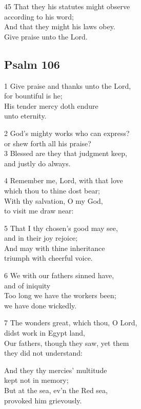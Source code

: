 45 That they his statutes might observe\\
according to his word;\\
And that they might his laws obey.\\
Give praise unto the Lord.

\begin{center}
\quad{}\quad{}
\end{center}

\subsection*{Psalm 106}

1 Give praise and thanks unto the Lord,\\
for bountiful is he;\\
His tender mercy doth endure\\
unto eternity.

2 God’s mighty works who can express?\\
or shew forth all his praise?\\
3 Blessed are they that judgment keep,\\
and justly do always.

4 Remember me, Lord, with that love\\
which thou to thine dost bear;\\
With thy salvation, O my God,\\
to visit me draw near:

5 That I thy chosen’s good may see,\\
and in their joy rejoice;\\
And may with thine inheritance\\
triumph with cheerful voice.

6 We with our fathers sinned have,\\
and of iniquity\\
Too long we have the workers been;\\
we have done wickedly.

7 The wonders great, which thou, O Lord,\\
didst work in Egypt land,\\
Our fathers, though they saw, yet them\\
they did not understand:

And they thy mercies’ multitude\\
kept not in memory;\\
But at the sea, ev’n the Red sea,\\
provoked him grievously.

